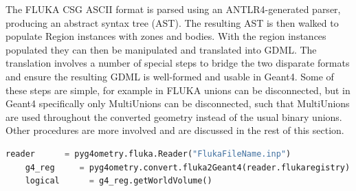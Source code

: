 \documentclass[final,5p,times,twocolumn]{elsarticle}
\newcommand{\PYGEOMETRY}{\textsc{Pyg4ometry}}
\begin{document}
The FLUKA CSG ASCII format is parsed using an ANTLR4-generated parser,
producing an abstract syntax tree (AST).  The resulting AST is then walked
to populate Region instances with zones and bodies.  With the region
instances populated they can then be manipulated and translated into GDML.
The translation involves a number of special steps to bridge the two
disparate formats and ensure the resulting GDML is well-formed and usable
in Geant4.  Some of these steps are simple, for example in FLUKA unions can
be disconnected, but in Geant4 specifically only MultiUnions can be
disconnected, such that MultiUnions are used throughout the converted
geometry instead of the usual binary unions.  Other procedures are more
involved and are discussed in the rest of this section.

\begin{lstlisting}[caption={A simple \PYGEOMETRY{} Python script to load a FLUKA file.},label={lst:pythonFlukaLoading}, language=Python]
    reader      = pyg4ometry.fluka.Reader("FlukaFileName.inp")
    g4_reg     = pyg4ometry.convert.fluka2Geant4(reader.flukaregistry)
    logical      = g4_reg.getWorldVolume()
\end{lstlisting}
\end{document}
